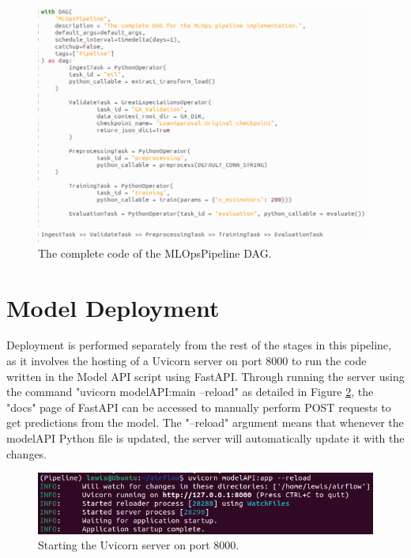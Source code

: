 \documentclass[12pt]{report}
\begin{document}
\begin{figure}[H]
    \centering
    \includegraphics[width=\linewidth]{Implementation/.Code/PipelineDAG.png}
    \caption{The complete code of the MLOpsPipeline DAG.}
    \label{fig:PipelineDAGCode}
\end{figure}

\section{Model Deployment}\label{sec:ImpDeployment}
Deployment is performed separately from the rest of the stages in this pipeline, 
as it involves the hosting of a Uvicorn server on port 8000 to run the code written 
in the Model API script using FastAPI. Through running the server using the command 
"uvicorn modelAPI:main --reload" as detailed in Figure 
\ref{fig:UviStartup}, the "docs" page of FastAPI can be accessed to manually perform POST 
requests to get predictions from the model. The "--reload" argument means that whenever the 
modelAPI Python file is updated, the server will automatically update it with the changes.

\begin{figure}[H]
    \centering
    \includegraphics[width=\linewidth]{Implementation/FastAPI+Uvi/Startup.png}
    \caption{Starting the Uvicorn server on port 8000.}
    \label{fig:UviStartup}
\end{figure}
\end{document}
